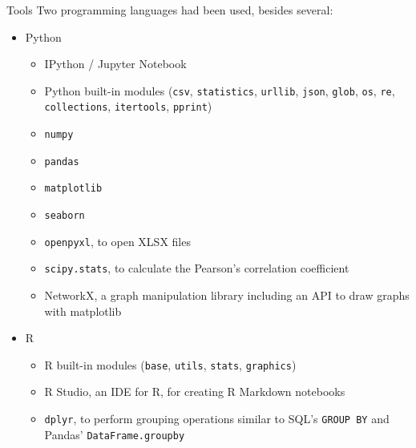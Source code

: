\documentclass[utf8]{beamer}
\begin{document}
\begin{frame}{Tools}
  Two programming languages had been used,
  besides several:
  \begin{itemize}
    \item Python
    \begin{itemize}
      \item IPython / Jupyter Notebook
      \item Python built-in modules
            (\texttt{csv}, \texttt{statistics}, \texttt{urllib},
             \texttt{json}, \texttt{glob}, \texttt{os}, \texttt{re},
             \texttt{collections}, \texttt{itertools},
             \texttt{pprint})
      \item \texttt{numpy}
      \item \texttt{pandas}
      \item \texttt{matplotlib}
      \item \texttt{seaborn}
      \item \texttt{openpyxl},
            to open XLSX files
      \item \texttt{scipy.stats},
            to calculate the Pearson's correlation coefficient
      \item NetworkX,
            a graph manipulation library
            including an API to draw graphs with matplotlib
    \end{itemize}

    \item R
    \begin{itemize}
      \item R built-in modules
            (\texttt{base}, \texttt{utils}, \texttt{stats},
             \texttt{graphics})
      \item R Studio, an IDE for R, for creating R Markdown notebooks
      \item \texttt{dplyr},
            to perform grouping operations
            similar to SQL's \texttt{GROUP BY}
            and Pandas' \texttt{DataFrame.groupby}
    \end{itemize}
  \end{itemize}
\end{frame}
\end{document}
